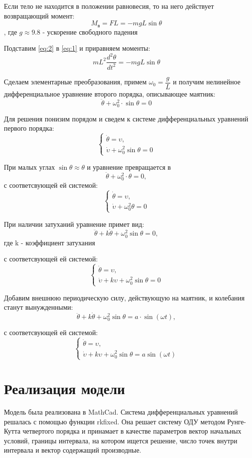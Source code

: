 \documentclass[a4paper, 14pt]{extarticle}
\begin{document}
		Если тело не находится в положении равновесия, то на него действует возвращающий момент:
		\[ M_{\text{в}} = FL = -mgL\sin{\theta} \], где $g \approx 9.8$ - ускорение свободного падения
		
		Подставим \eqref{eq:2} в \eqref{eq:1} и приравняем моменты:
		\[ mL^2\dfrac{d^2\theta}{dt^2} = -mgL\sin{\theta} \] 
		
		Сделаем элементарные преобразования, примем $\omega_0 = \dfrac{g}{L}$ и получим нелинейное дифференциальное уравнение второго порядка, описывающее маятник:
		\[ \ddot{\theta} + \omega_0^2 \cdot \sin{\theta} = 0 \]
		
		Для решения понизим порядом и сведем к системе дифференциальных уравнений первого порядка:
		\[\begin{cases}
			\dot{\theta} = \upsilon, \\
			\dot{\upsilon} + \omega_0^2\sin{\theta} = 0
		\end{cases}\]
		
		При малых углах \( \sin{\theta} \approx \theta \) и уравнение превращается в
		\[ \ddot{\theta} + \omega_0^2 \cdot \theta = 0, \]
		с соответсвующей ей системой:
		\[\begin{cases}
			\dot{\theta} = \upsilon, \\
			\dot{\upsilon} + \omega_0^2\theta = 0
		\end{cases}\]
		
		При наличии затуханий уравнение примет вид:
		\[ \ddot{\theta} + k \dot{\theta} + \omega_0^2\sin{\theta} = 0, \]
		где k - коэффициент затухания
		
		с соответсвующей ей системой:
		\[\begin{cases}
			\dot{\theta} = \upsilon, \\
			\dot{\upsilon} + k\upsilon +\omega_0^2\sin{\theta} = 0
		\end{cases}\]
		
		Добавим внешнюю периодическую силу, действующую на маятник, и колебания станут вынужденными:
		\[ \ddot{\theta} + k \dot{\theta} + \omega_0^2\sin{\theta} = a \cdot \sin{(\omega t)}, \]
		
		с соответсвующей ей системой:
		\[\begin{cases}
			\dot{\theta} = \upsilon, \\
			\dot{\upsilon} + k\upsilon +\omega_0^2\sin{\theta} = a\sin{(\omega t)}
		\end{cases}\]
	
	\pagebreak
	\section{Реализация модели}
		Модель была реализована в MathCad. Система дифференциальных уравнений решалась с помощью функции rkfixed.
		Она решает систему ОДУ методом Рунге-Кутта четвертого порядка и принамает в качестве параметров вектор начальных условий, границы интервала, на котором ищется решение, число точек внутри интервала и вектор содержащий производные.
\end{document}
